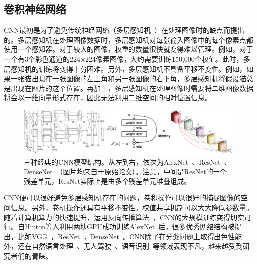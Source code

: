 \subsection{卷积神经网络}\label{subsec:cnn_introduction}
CNN最初是为了避免传统神经网络（多层感知机~\cite{gardner1998artificial}）在处理图像时的缺点而提出的。多层感知机在处理图像数据时，多层感知机对每张输入图像中的每个像素点都使用一个感知器。对于较大的图像，权重的数量很快就变得难以管理。例如，对于一个有3个彩色通道的224$\times$224像素图像，大约需要训练150,000个权值。此时，多层感知机的训练将变得十分困难。另外，多层感知机不具备平移不变性。例如，如果一张猫出现在一张图像的左上角和另一张图像的右下角，多层感知机将假设猫总是出现在图片的这个位置。再加上，多层感知机在处理图像时需要将二维图像数据将会以一维向量形式存在，因此无法利用二维空间的相对位置信息。
\begin{figure}[h]
	\centering
	\includegraphics[width=1.0\textwidth]{figure/popular_networks}
	\caption{三种经典的CNN模型结构。从左到右，依次为AlexNet~\cite{krizhevsky2012imagenet}、ResNet~\cite{he2016deep, he2016identity}、DenseNet~\cite{huang2017densely}（图片均来自于原始论文）。注意，中间是ResNet的一个残差单元，ResNet实际上是由多个残差单元堆叠组成。} 
	\label{fig:popular_networks}
\end{figure}


CNN便可以很好避免多层感知机存在的问题，卷积操作可以很好的捕捉图像的空间信息。另外，卷机操作还具有平移不变性。权值共享机制可以大大降低参数量。随着计算机算力的快速提升，运用反向传播算法~\cite{hecht1992theory}，CNN的大规模训练变得切实可行。自Hinton等人利用两块GPU成功训练AlexNet~\cite{krizhevsky2012imagenet}后，很多优秀网络结构被提出，比如VGG~\cite{simonyan2014very}，ResNet~\cite{he2016deep, he2016identity}，DenseNet~\cite{huang2017densely}。CNN除了在分类问题上取得出色性能外，还在自然语言处理~\cite{dos2014deep}、无人驾驶~\cite{lee2017deep}、语音识别~\cite{abdel2013exploring}等领域表现不凡，越来越受到研究者们的青睐。

